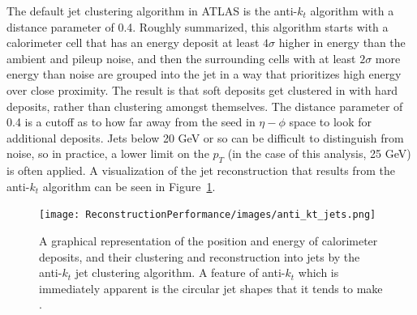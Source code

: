 The default jet clustering algorithm in ATLAS is the anti-$k_t$ algorithm \cite{antikt}
with a distance parameter of 0.4.  Roughly summarized, this algorithm starts with a calorimeter cell that 
has an energy deposit at least $4\sigma$ higher in energy than the ambient and pileup noise, 
and then the surrounding cells with at least $2\sigma$ more energy than noise are grouped into 
the jet in a way that prioritizes high energy over close proximity.  The result is that soft deposits get 
clustered in with hard deposits, rather than clustering amongst themselves.  The distance parameter of 0.4 is 
a cutoff as to how far away from the seed in $\eta-\phi$ space to look for 
additional deposits.   Jets below 20 GeV or so can be difficult to distinguish from noise, so in practice, a lower limit on 
the $p_T$ (in the case of this analysis, 25 GeV) is often applied.  A visualization of the jet reconstruction that results
from the anti-$k_t$ algorithm can be seen in Figure~\ref{fig:anti_kt_jets}.


\begin{figure}
    \center
	\texttt{[image: ReconstructionPerformance/images/anti\_kt\_jets.png]}
	\caption{A graphical representation of the position and energy of calorimeter deposits, and their clustering and reconstruction into jets by the anti-$k_t$ jet clustering algorithm.  A feature of anti-$k_t$ which is immediately apparent is the circular jet shapes that it tends to make \cite{antikt}.  \label{fig:anti_kt_jets}  }
\end{figure}







